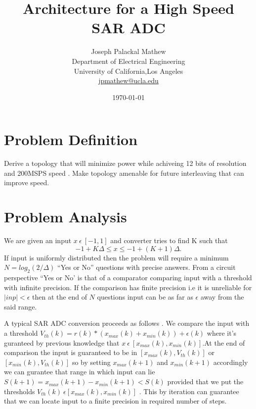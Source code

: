 \documentclass[a4paper,10pt,fleqn,titlepage,twoside]{article}
\title{Architecture for a High Speed SAR ADC}
\author{
        Joseph Palackal Mathew \\
	Department of Electrical Engineering\\
        University of California,Los Angeles\\ 
	\href{mailto:jpmathew@ucla.edi}{jpmathew@ucla.edu}
}
\date{\today}
\begin{document}
\maketitle

\section*{Problem Definition}
Derive a topology that will minimize power while achiveing 12 bits of resolution and 200MSPS speed . Make topology amenable for future interleaving 
that can improve speed.

\section*{Problem Analysis}

We are given an input $x\:\epsilon\:[-1,1]$ and converter tries to find K such that $$-1+K\Delta \leq x \leq -1+(K+1)\Delta.$$ If input
is uniformly distributed then the problem will require a minimum $N=log_2(2/\Delta)$ ``Yes or No'' questions with precise answers. From a circuit
perspective ``Yes or No' is that of a comparator comparing input with a threshold with infinite precision. If the
comparison has finite precision i.e it is unreliable for $|inp| < \epsilon $ then at the end of $N$ questions input can be as far as
$\epsilon$ away from the said range.

A typical SAR ADC conversion proceeds as follows . We compare the input with a threshold $V_{th}(k) = r(k)*(x_{max}(k)+x_{min}(k)) + \epsilon(k) $ where it's
guranteed by previous knowledge that $x\:\epsilon\:[x_{max}(k),x_{min}(k)]$.At the end of comparison the input is guaranteed to be in
$[x_{max}(k),V_{th}(k)]$ or $[x_{min}(k),V_{th}(k)]$ so by setting $x_{max}(k+1)$ and $x_{min}(k+1)$ accordingly we can gurantee that range in which 
input can lie $S(k+1)=x_{max}(k+1)-x_{min}(k+1) < S(k)$ provided that we put the thresholds  $V_{th}(k)\:\epsilon[x_{max}(k),x_{min}(k)]$ . This by iteration 
can guarantee that we can locate input to a finite precision in required number of steps.

\newpage
\end{document}
